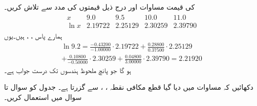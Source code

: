 \quad {}\\
 کی قیمت مساوات  اور درج ذیل قیمتوں کی مدد سے تلاش کریں۔
\begin{align*}
\begin{array}{ccccc}
x&9.0&9.5&10.0&11.0\\
\ln x&\num{2.19722}&\num{2.25129}&\num{2.30259}&\num{2.39790}
\end{array}
\end{align*}
ہمارے پاس ، ،  ہیں۔یوں 
\begin{multline*}
\ln 9.2=\frac{-0.43200}{-1.00000}\cdot 2.19722+\frac{0.28800}{0.37500}\cdot 2.25129\\
+\frac{0.10800}{-0.50000}\cdot 2.30259+\frac{0.04800}{3.00000}\cdot 2.39790=2.21920
\end{multline*}
ہو گا جو پانچ ملحوظ ہندسوں تک درست جواب ہے۔

\quad
دکھائیں کہ مساوات  میں دیا گیا قطع مکافی نقطہ ، ،  سے گزرتا ہے۔
جدول  کو سوال  تا سوال  میں استعمال کریں۔

